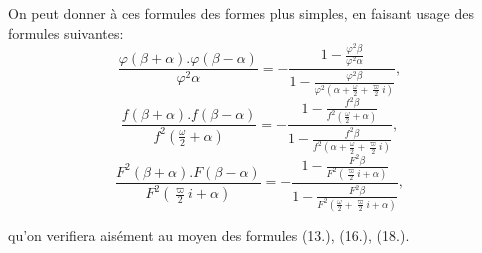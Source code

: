 \documentclass{article}
\begin{document}
On peut donner à ces formules des formes plus simples, en faisant usage des formules suivantes:
\[ \frac{\varphi(\beta+\alpha).\varphi(\beta-\alpha)}{\varphi^{2}\alpha}=-\frac{1-\frac{\varphi^{2}\beta}{\varphi^{2}\alpha}}{1-\frac{\varphi^{2}\beta}{\varphi^{2}\left(\alpha+\frac{\omega}{2}+\frac{\varpi}{2}i\right)}}, \]
\[ \frac{f(\beta+\alpha).f(\beta-\alpha)}{f^{2}\left(\frac{\omega}{2}+\alpha\right)}=-\frac{1-\frac{f^{2}\beta}{f^{2}\left(\frac{\omega}{2}+\alpha\right)}}{1-\frac{f^{2}\beta}{f^{2}\left(\alpha+\frac{\omega}{2}+\frac{\varpi}{2}i\right)}}, \]
\[ \frac{F^{2}(\beta+\alpha).F(\beta-\alpha)}{F^{2}\left(\frac{\varpi}{2}i+\alpha\right)}=-\frac{1-\frac{F^{2}\beta}{F^{2}\left(\frac{\varpi}{2}i+\alpha\right)}}{1-\frac{F^{2}\beta}{F^{2}\left(\frac{\omega}{2}+\frac{\varpi}{2}i+\alpha\right)}}, \]

qu'on verifiera aisément au moyen des formules (13.), (16.), (18.).
\end{document}
